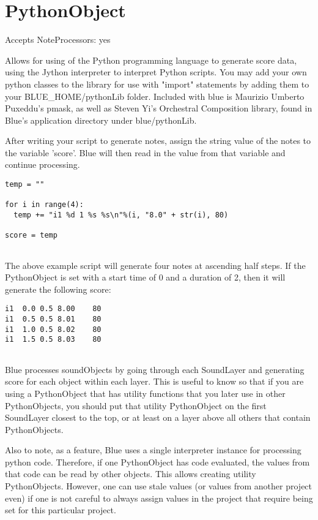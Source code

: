 \section{PythonObject}\label{pythonObject}

Accepts NoteProcessors: yes

Allows for using of the Python programming language to generate score
data, using the Jython interpreter to interpret Python scripts. You may
add your own python classes to the library for use with "import"
statements by adding them to your BLUE\_HOME/pythonLib folder. Included
with blue is Maurizio Umberto Puxeddu's pmask, as well as Steven Yi's
Orchestral Composition library, found in Blue's application directory
under blue/pythonLib.

After writing your script to generate notes, assign the string value of
the notes to the variable 'score'. Blue will then read in the value from
that variable and continue processing.

\begin{verbatim}
temp = ""

for i in range(4):
  temp += "i1 %d 1 %s %s\n"%(i, "8.0" + str(i), 80)

score = temp
    
\end{verbatim}

The above example script will generate four notes at ascending half
steps. If the PythonObject is set with a start time of 0 and a duration
of 2, then it will generate the following score:

\begin{verbatim}
i1  0.0 0.5 8.00    80
i1  0.5 0.5 8.01    80
i1  1.0 0.5 8.02    80
i1  1.5 0.5 8.03    80
    
\end{verbatim}

Blue processes soundObjects by going through each SoundLayer and
generating score for each object within each layer. This is useful to
know so that if you are using a PythonObject that has utility functions
that you later use in other PythonObjects, you should put that utility
PythonObject on the first SoundLayer closest to the top, or at least on
a layer above all others that contain PythonObjects.

Also to note, as a feature, Blue uses a single interpreter instance for
processing python code. Therefore, if one PythonObject has code
evaluated, the values from that code can be read by other objects. This
allows creating utility PythonObjects. However, one can use stale values
(or values from another project even) if one is not careful to always
assign values in the project that require being set for this particular
project.

